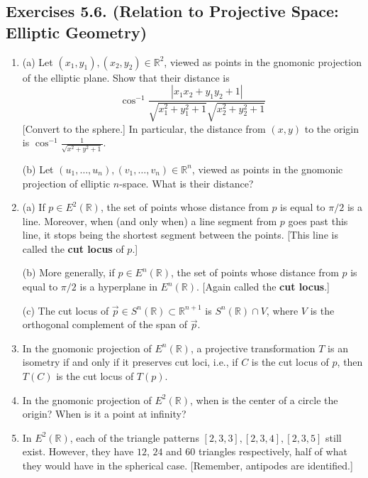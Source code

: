 \documentclass[leqno]{book}
\begin{document}
\subsection*{Exercises 5.6. (Relation to Projective Space: Elliptic Geometry)} %
\begin{enumerate}
\item (a) Let $(x_1,y_1),(x_2,y_2)\in\mathbb R^2$, viewed as points in the gnomonic projection of the elliptic plane.  Show that their distance is
$$\cos^{-1}\frac{|x_1x_2+y_1y_2+1|}{\sqrt{x_1^2+y_1^2+1}\sqrt{x_2^2+y_2^2+1}}$$
[Convert to the sphere.]  In particular, the distance from $(x,y)$ to the origin is $\cos^{-1}\frac 1{\sqrt{x^2+y^2+1}}$.

(b) Let $(u_1,\dots,u_n),(v_1,\dots,v_n)\in\mathbb R^n$, viewed as points in the gnomonic projection of elliptic $n$-space.  What is their distance?

\item (a) If $p\in E^2(\mathbb R)$, the set of points whose distance from $p$ is equal to $\pi/2$ is a line.  Moreover, when (and only when) a line segment from $p$ goes past this line, it stops being the shortest segment between the points.  [This line is called the \textbf{cut locus} of $p$.]

(b) More generally, if $p\in E^n(\mathbb R)$, the set of points whose distance from $p$ is equal to $\pi/2$ is a hyperplane in $E^n(\mathbb R)$.  [Again called the \textbf{cut locus}.] %

(c) The cut locus of $\vec p\in S^n(\mathbb R)\subset\mathbb R^{n+1}$ is $S^n(\mathbb R)\cap V$, where $V$ is the orthogonal complement of the span of $\vec p$.

\item In the gnomonic projection of $E^n(\mathbb R)$, a projective transformation $T$ is an isometry if and only if it preserves cut loci, i.e., if $C$ is the cut locus of $p$, then $T(C)$ is the cut locus of $T(p)$.

\item In the gnomonic projection of $E^2(\mathbb R)$, when is the center of a circle the origin?  When is it a point at infinity?

\item In $E^2(\mathbb R)$, each of the triangle patterns $[2,3,3],[2,3,4],[2,3,5]$ still exist.  However, they have $12$, $24$ and $60$ triangles respectively, half of what they would have in the spherical case.  [Remember, antipodes are identified.]


\end{enumerate}
\end{document}
